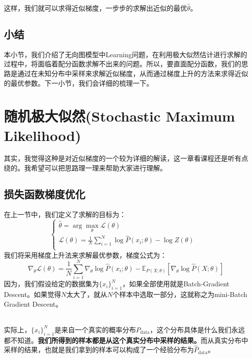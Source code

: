 \documentclass[a4paper]{article}
\begin{document}
这样，我们就可以求得近似梯度，一步步的求解出近似的最优$\hat{\theta}$。
\subsection{小结}
本小节，我们介绍了无向图模型中Learning问题，在利用极大似然估计进行求解的过程中，将面临着配分函数求解不出来的问题。所以，要直面配分函数，我们的思路是通过在未知分布中采样来求解近似梯度，从而通过梯度上升的方法来求得近似的最优参数。下一小节，我们会详细的梳理一下。

\section{随机极大似然(Stochastic Maximum Likelihood)}
其实，我觉得这种是对近似梯度的一个较为详细的解读，这一章看课程还是听有点绕的。我希望可以把思路理一理来帮助大家进行理解。
\subsection{损失函数梯度优化}
在上一节中，我们定义了求解的目标为：
\begin{equation}
  \left\{
    \begin{array}{ll}
      \hat{\theta} = \arg\max_\theta \mathcal{L}(\theta) & \\
      \mathcal{L}(\theta) = \frac{1}{N} \sum_{i=1}^N \log \hat{P}(x_i;\theta) - \log Z(\theta) & \\
    \end{array}
  \right.  
\end{equation}
我们将采用梯度上升法来求解最优参数，梯度公式为：
\begin{equation}
    \nabla_\theta \mathcal{L}(\theta) = \frac{1}{N} \sum_{i=1}^N \nabla_\theta \log \hat{P}(x_i;\theta) - \mathbb{E}_{P(X;\theta)}[\nabla_\theta \log \hat{P}(X;\theta)]
\end{equation}
因为，我们假设给定的数据集为$\{x_i\}_{i=1}^N$，如果全部使用就是Batch-Gradient Descent。如果觉得$N$太大了，就从$N$个样本中选取一部分，这就称之为mini-Batch Gradient Descent。

~\\

实际上，$\{x_i\}_{i=1}^N$是来自一个真实的概率分布$P_{\mathrm{data}}$，这个分布具体是什么我们永远都不知道。\textbf{我们所得到的样本都是从这个真实分布中采样的结果。}而从真实分布中采样的结果，也就是我们拿到的样本可以构成了一个经验分布为$\hat{P}_{\mathrm{data}}$。
\end{document}
